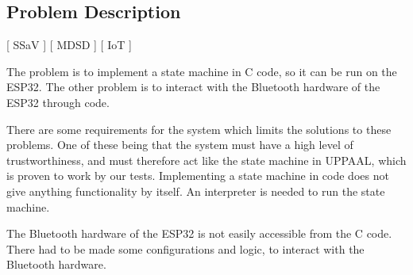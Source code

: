 \subsection{Problem Description}
[ SSaV ] [ MDSD ] [ IoT ] 
\newline

The problem is to implement a state machine in C code, so it can be run on the ESP32.
The other problem is to interact with the Bluetooth hardware of the ESP32 through code.

There are some requirements for the system which limits the solutions to these problems.
One of these being that the system must have a high level of trustworthiness, and must therefore act like the state machine in UPPAAL, which is proven to work by our tests.
Implementing a state machine in code does not give anything functionality by itself.
An interpreter is needed to run the state machine.

The Bluetooth hardware of the ESP32 is not easily accessible from the C code.
There had to be made some configurations and logic, to interact with the Bluetooth hardware.